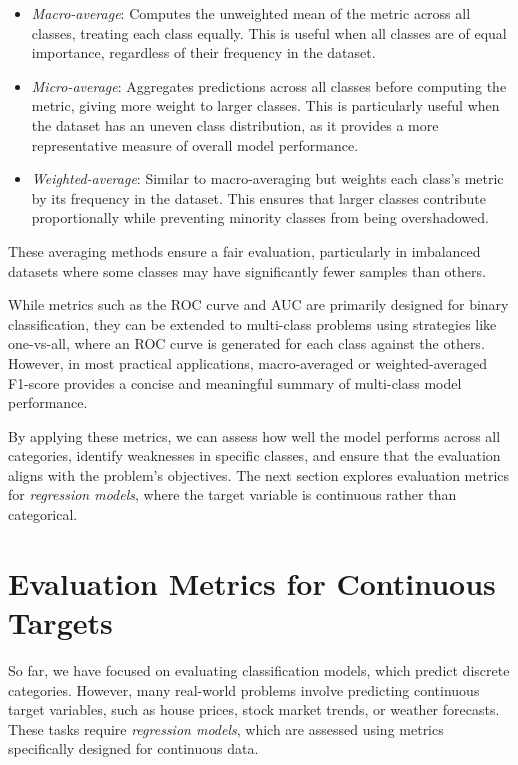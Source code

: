 \documentclass[
]{book}
\providecommand{\tightlist}{%
  \setlength{\itemsep}{0pt}\setlength{\parskip}{0pt}}
\theoremstyle{definition}
\theoremstyle{definition}
\theoremstyle{definition}
\theoremstyle{definition}
\theoremstyle{remark}
\begin{document}
\begin{itemize}
\tightlist
\item
  \emph{Macro-average}: Computes the unweighted mean of the metric across all classes, treating each class equally. This is useful when all classes are of equal importance, regardless of their frequency in the dataset.\\
\item
  \emph{Micro-average}: Aggregates predictions across all classes before computing the metric, giving more weight to larger classes. This is particularly useful when the dataset has an uneven class distribution, as it provides a more representative measure of overall model performance.\\
\item
  \emph{Weighted-average}: Similar to macro-averaging but weights each class's metric by its frequency in the dataset. This ensures that larger classes contribute proportionally while preventing minority classes from being overshadowed.
\end{itemize}

These averaging methods ensure a fair evaluation, particularly in imbalanced datasets where some classes may have significantly fewer samples than others.

While metrics such as the ROC curve and AUC are primarily designed for binary classification, they can be extended to multi-class problems using strategies like one-vs-all, where an ROC curve is generated for each class against the others. However, in most practical applications, macro-averaged or weighted-averaged F1-score provides a concise and meaningful summary of multi-class model performance.

By applying these metrics, we can assess how well the model performs across all categories, identify weaknesses in specific classes, and ensure that the evaluation aligns with the problem's objectives. The next section explores evaluation metrics for \emph{regression models}, where the target variable is continuous rather than categorical.

\section{Evaluation Metrics for Continuous Targets}\label{evaluation-metrics-for-continuous-targets}

So far, we have focused on evaluating classification models, which predict discrete categories. However, many real-world problems involve predicting continuous target variables, such as house prices, stock market trends, or weather forecasts. These tasks require \emph{regression models}, which are assessed using metrics specifically designed for continuous data.
\end{document}
